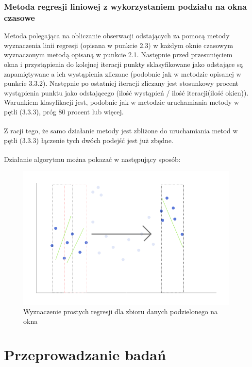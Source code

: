 \documentclass[eng,printmode]{mgr}
\begin{document}
\subsection{Metoda regresji liniowej z wykorzystaniem podziału na okna czasowe}
Metoda polegająca na obliczanie obserwacji odstających za pomocą metody wyznaczenia linii regresji (opisana w punkcie 2.3) w każdym oknie czasowym wyznaczonym metodą opisaną w punkcie 2.1. Następnie przed przesunięciem okna i przystąpienia do kolejnej iteracji punkty sklasyfikowane jako odstające są zapamiętywane a ich wystąpienia zliczane (podobnie jak w metodzie opisanej w punkcie 3.3.2). Następnie po ostatniej iteracji zliczany jest stosunkowy procent wystąpienia punktu jako odstającego (ilość wystąpień / ilość iteracji(ilość okien)). Warunkiem klasyfikacji jest, podobnie jak w metodzie uruchamiania metody w pętli (3.3.3), próg 80 procent lub więcej. \\\\
Z racji tego, że samo działanie metody jest zbliżone do uruchamiania metod w pętli (3.3.3) łączenie tych dwóch podejść jest już zbędne.
\\\\
Działanie algorytmu można pokazać w następujący sposób:
\begin{figure}[H]
  \begin{center}
  \includegraphics[scale=0.7]{reg_windowed}
  \end{center}
  \caption{Wyznaczenie prostych regresji dla zbioru danych podzielonego na okna}
\end{figure}
\chapter{Przeprowadzanie badań}
\end{document}
